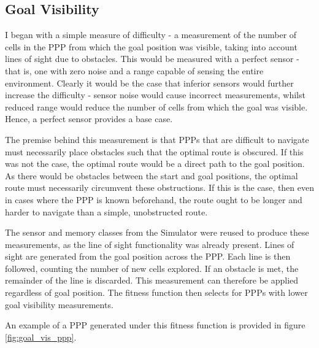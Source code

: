 \documentclass[authoryearcitations]{UoYCSproject}
\begin{document}
\subsection{Goal Visibility}
\label{sec:goal_vis}
I began with a simple measure of difficulty - a measurement of the number of cells in the PPP from which the goal position was visible, taking into account lines of sight due to obstacles. This would be measured with a perfect sensor - that is, one with zero noise and a range capable of sensing the entire environment. Clearly it would be the case that inferior sensors would further increase the difficulty - sensor noise would cause incorrect measurements, whilst reduced range would reduce the number of cells from which the goal was visible. Hence, a perfect sensor provides a base case.

The premise behind this measurement is that PPPs that are difficult to navigate must necessarily place obstacles such that the optimal route is obscured. If this was not the case, the optimal route would be a direct path to the goal position. As there would be obstacles between the start and goal positions, the optimal route must necessarily circumvent these obstructions. If this is the case, then even in cases where the PPP is known beforehand, the route ought to be longer and harder to navigate than a simple, unobstructed route.

The sensor and memory classes from the Simulator were reused to produce these measurements, as the line of sight functionality was already present. Lines of sight are generated from the goal position across the PPP. Each line is then followed, counting the number of new cells explored. If an obstacle is met, the remainder of the line is discarded. This measurement can therefore be applied regardless of goal position. The fitness function then selects for PPPs with lower goal visibility measurements.

An example of a PPP generated under this fitness function is provided in figure \ref{fig:goal_vis_ppp}.
\end{document}
